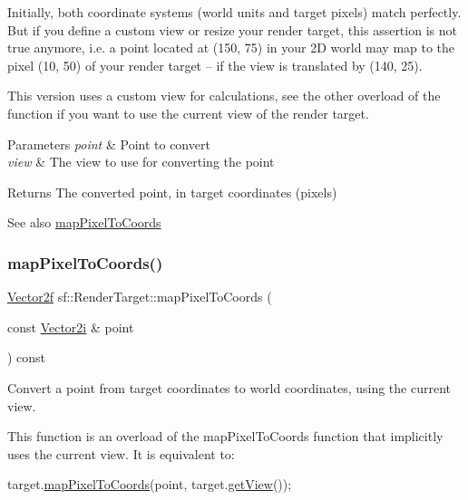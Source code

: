 Initially, both coordinate systems (world units and target pixels) match perfectly. But if you define a custom view or resize your render target, this assertion is not true anymore, i.\+e. a point located at (150, 75) in your 2D world may map to the pixel (10, 50) of your render target -- if the view is translated by (140, 25).

This version uses a custom view for calculations, see the other overload of the function if you want to use the current view of the render target.


\begin{DoxyParams}{Parameters}
{\em point} & Point to convert \\
\hline
{\em view} & The view to use for converting the point\\
\hline
\end{DoxyParams}
\begin{DoxyReturn}{Returns}
The converted point, in target coordinates (pixels)
\end{DoxyReturn}
\begin{DoxySeeAlso}{See also}
\hyperlink{classsf_1_1_render_target_a0103ebebafa43a97e6e6414f8560d5e3}{map\+Pixel\+To\+Coords} 
\end{DoxySeeAlso}
\mbox{\label{classsf_1_1_render_target_a0103ebebafa43a97e6e6414f8560d5e3}} 
\subsubsection{\texorpdfstring{map\+Pixel\+To\+Coords()}{mapPixelToCoords()}\hspace{0.1cm}{\footnotesize\ttfamily [1/2]}}
{\footnotesize\ttfamily \hyperlink{classsf_1_1_vector2}{Vector2f} sf\+::\+Render\+Target\+::map\+Pixel\+To\+Coords (\begin{DoxyParamCaption}\item[{const \hyperlink{classsf_1_1_vector2}{Vector2i} \&}]{point }\end{DoxyParamCaption}) const}



Convert a point from target coordinates to world coordinates, using the current view. 

This function is an overload of the map\+Pixel\+To\+Coords function that implicitly uses the current view. It is equivalent to\+: 
\begin{DoxyCode}
target.\hyperlink{classsf_1_1_render_target_a0103ebebafa43a97e6e6414f8560d5e3}{mapPixelToCoords}(point, target.\hyperlink{classsf_1_1_render_target_a2c179503b4dcdf5282ef6426d317602c}{getView}());
\end{DoxyCode}



